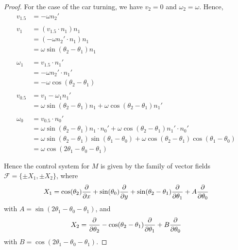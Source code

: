 \documentclass{article}
\begin{document}
\begin{proof}
For the case of the car turning, we have $v_2 = 0$ and $\omega_2 = \omega$. Hence,
\begin{align*}
v_{1.5} & =  -\omega n_2'
\\
\\ v_1 & =  (v_{1.5} \cdot n_1) n_1
\\ & =  (-\omega n_2' \cdot n_1) n_1
\\ & = \omega \sin(\theta_2 - \theta_1) n_1
\\
\\ \omega_1 & =  v_{1.5} \cdot n_1'
\\ & = - \omega n_2' \cdot n_1'
\\ & =  -\omega \cos(\theta_2 - \theta_1)
\\
\\ v_{0.5} & =  v_1  - \omega_1 n_1'
\\ & = \omega \sin(\theta_2 - \theta_1) n_1 + \omega \cos(\theta_2 - \theta_1) n_1'
\\
\\  \omega_0 & = v_{0.5} \cdot n_0'
\\ & = \omega \sin(\theta_2 - \theta_1) n_1 \cdot n_0' + \omega \cos(\theta_2 - \theta_1) n_1' \cdot n_0'
\\ & = \omega \sin(\theta_2 - \theta_1) \sin(\theta_1 - \theta_0) + \omega \cos(\theta_2 - \theta_1) \cos(\theta_1 - \theta_0)
\\ & = \omega \cos(2 \theta_1 - \theta_0 - \theta_1)
\end{align*}

Hence the control system for $M$ is given by the family of vector fields $\mathcal F = \{\pm X_1, \pm X_2\}$, where
$$X_1 = \cos(\theta_2) \frac{\partial}{\partial x}  + \sin(\theta_0) \frac{\partial}{\partial y}  + \sin(\theta_2 - \theta_1)  \frac{\partial}{\partial\theta_1} + A \frac{\partial}{\partial\theta_0}$$
with $A = \sin(2 \theta_1 - \theta_0 - \theta_1)$,
and
$$X_2 =  \frac{\partial}{\partial\theta_2} - \cos(\theta_2 - \theta_1) \frac{\partial}{\partial\theta_1} + B \frac{\partial}{\partial\theta_0}$$
with $B = \cos(2 \theta_1 - \theta_0 - \theta_1)$.
\end{proof}
\end{document}
